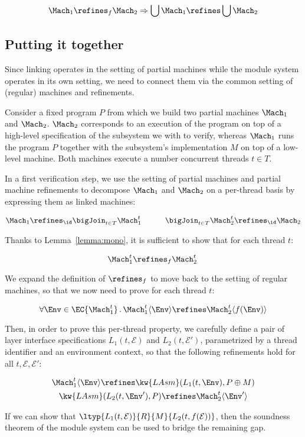 \begin{lemma}
\begin{small}
\[ \Mach_1 \refines_f \Mach_2 \Rightarrow \bigcup \Mach_1 \refines \bigcup \Mach_2 \]
\end{small}
\end{lemma}

\subsection{Putting it together}

Since linking operates in the setting of partial machines
while the module system operates in its own setting,
we need to connect them
via the common setting of (regular) machines and refinements.

Consider a fixed program $P$
from which we build two partial machines $\Mach_1$ and $\Mach_2$.
$\Mach_2$ corresponds to an execution of the program
on top of a high-level specification of the subsystem
we with to verify,
whereas $\Mach_1$ runs the program $P$ together with the subsystem's implementation $M$
on top of a low-level machine.
Both machines execute a number concurrent threads $t \in T$.

In a first verification step,
we use the setting of partial machines and partial machine refinements to 
decompose $\Mach_1$ and $\Mach_2$ on a per-thread basis
by expressing them as linked machines:
\begin{small}
\[
	\Mach_1 \refines_\id \bigJoin_{t \in T} \Mach_1^t  \hspace{3em}
	\bigJoin_{t \in T} \Mach_2^t \refines_\id \Mach_2
\]
\end{small}%
Thanks to Lemma~\ref{lemma:mono},
it is sufficient to show that for each thread $t$:
\begin{small}
\[
		\Mach_1^t \refines_f \Mach_2^t \,
\]
\end{small}%
We expand the definition of $\refines_f$
to move back to the setting of regular machines,
so that we now need to prove for each thread $t$:
\begin{small}
\[
	\forall \Env \in \EC{\Mach_1^t}\,.\,
		\Mach_1^t \langle \Env \rangle \refines
		\Mach_2^t \langle f(\Env) \rangle
\]
\end{small}%
Then, in order to prove this per-thread property,
we carefully define a pair of layer interface specifications
$L_1(t, \mathcal{E})$ and $L_2(t, \mathcal{E}')$,
parametrized by a thread identifier and an environment context,
so that the following refinements hold for all $t, \mathcal{E}, \mathcal{E}'$:
\begin{small}
\begin{gather*}
	\Mach_1^t \langle \Env \rangle \refines \kw{LAsm}(L_1(t, \Env), P \oplus M) \\
	\kw{LAsm}(L_2(t, \Env'), P) \refines \Mach_2^t \langle \Env' \rangle
\end{gather*}
\end{small}%
If we can show that
$ \ltyp{L_1(t, \mathcal{E})}{R}{M}{L_2(t, f(\mathcal{E}))} $,
then the soundness theorem of the module system
can be used to bridge the remaining gap.


